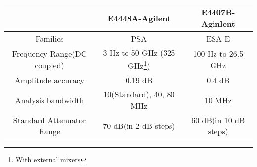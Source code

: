 \documentclass[logo=images/logo.png]{tehranReport}
\begin{document}
	\begin{center}
		\begin{latin}
			\begin{tabular}{|c || c c|}
				\cline{2-3}
				\multicolumn{1}{c}{}&\multicolumn{1}{|c}{\textbf{E4448A-Agilent}}&\multicolumn{1}{c|}{\textbf{E4407B-Aginlent}}\\
				\hline\hline
				Families & PSA & ESA-E\\
				\hline
				Frequency Range(DC coupled) & 3 Hz to 50 GHz (325 GHz\footnote{With external mixers}) & 100 Hz to 26.5 GHz\\
				\hline
				Amplitude accuracy & 0.19 dB & 0.4 dB\\ 
				\hline
				Analysis bandwidth & 10(Standard), 40, 80 MHz & 10 MHz\\
				\hline
				Standard Attenuator Range & 70 dB(in 2 dB steps) & 60 dB(in 10 dB steps)\\
				\hline
			\end{tabular}
		\end{latin}
	\end{center}
\end{document}
